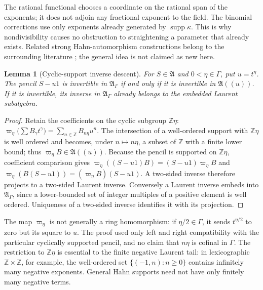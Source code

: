 \documentclass[11pt,a4paper]{article}
\numberwithin{equation}{section}
\newtheorem{lemma}[lemma]{Lemma}
\theoremstyle{definition}
\theoremstyle{remark}
\newcommand{\Z}{\mathbb Z}
\newcommand{\supp}{\operatorname{supp}}
\newcommand{\Alg}{\mathfrak A}
\newcommand{\AlgG}{\mathfrak A_\Gamma}
\begin{document}
The rational functional chooses a coordinate on the rational span of the
exponents; it does not adjoin any fractional exponent to the field. The
binomial corrections use only exponents already generated by
$\supp\kappa$. This is why nondivisibility causes no obstruction to
straightening a parameter that already exists. Related strong
Hahn-automorphism constructions belong to the surrounding literature
\cite{KaplanKrappSerra}; the general idea is not claimed as new here.

\begin{lemma}[Cyclic-support inverse descent]\label{ihs:dz:lem:projection}
For $S\in\Alg$ and $0<\eta\in\Gamma$, put $u=t^\eta$. The pencil $S-u1$ is
invertible in $\AlgG$ if and only if it is invertible in $\Alg((u))$. If it
is invertible, its inverse in $\AlgG$ already belongs to the embedded
Laurent subalgebra.
\end{lemma}
\begin{proof}
Retain the coefficients on the cyclic subgroup $\Z\eta$:
$\varpi_\eta\bigl(\sum B_\gamma t^\gamma\bigr)=\sum_{n\in\Z}B_{n\eta}u^n$.
The intersection of a well-ordered support with $\Z\eta$ is well ordered and
becomes, under $n\mapsto n\eta$, a subset of $\Z$ with a finite lower bound;
thus $\varpi_\eta B\in\Alg((u))$. Because the pencil is supported on
$\Z\eta$, coefficient comparison gives
$\varpi_\eta((S-u1)B)=(S-u1)\varpi_\eta B$ and
$\varpi_\eta(B(S-u1))=(\varpi_\eta B)(S-u1)$. A two-sided inverse therefore
projects to a two-sided Laurent inverse. Conversely a Laurent inverse embeds
into $\AlgG$, since a lower-bounded set of integer multiples of a positive
element is well ordered. Uniqueness of a two-sided inverse identifies it
with its projection.
\end{proof}

The map $\varpi_\eta$ is not generally a ring homomorphism: if
$\eta/2\in\Gamma$, it sends $t^{\eta/2}$ to zero but its square to $u$. The
proof used only left and right compatibility with the particular cyclically
supported pencil, and no claim that $n\eta$ is cofinal in $\Gamma$.
The restriction to $\Z\eta$ is essential to the finite negative Laurent
tail: in lexicographic $\Z\times\Z$, for example, the well-ordered set
$\{(-1,n):n\ge0\}$ contains infinitely many negative exponents. General
Hahn supports need not have only finitely many negative terms.
\end{document}
